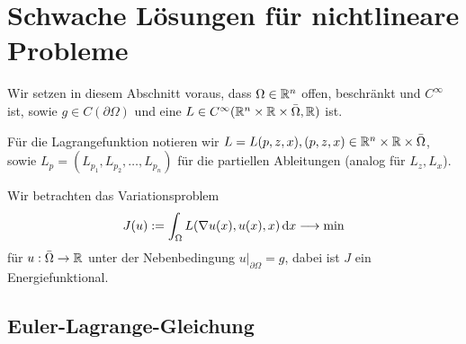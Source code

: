 \section{Schwache Lösungen für nichtlineare Probleme}

Wir setzen in diesem Abschnitt voraus, dass $\Omega \in\mathbb{R}^n$  offen, beschränkt und $C^\infty$ ist, sowie $g \in C(\partial \Omega)$ und eine  $L\in C^\infty (\mathbb{R}^n \times \mathbb{R} \times \bar\Omega, \mathbb{R})$ ist.

\begin{notation}
Für die Lagrangefunktion notieren wir $L = L(p,z,x), (p,z,x)\in \mathbb{R}^n\times \mathbb{R}\times \bar \Omega$, sowie $L_p = (L_{p_1}, L_{p_2}, \ldots, L_{p_n})$ für die partiellen Ableitungen (analog für $L_z, L_x$).
\end{notation}

Wir betrachten das Variationsproblem
\[
	J(u) := \int_\Omega L(\nabla u(x), u(x), x) \,\mathrm{d} x \longrightarrow \min
\]
für $u : \bar\Omega \rightarrow \mathbb{R}$ unter der Nebenbedingung $u \vert_{\partial \Omega} = g$, dabei ist $J$ ein Energiefunktional.

\subsection*{Euler-Lagrange-Gleichung}

